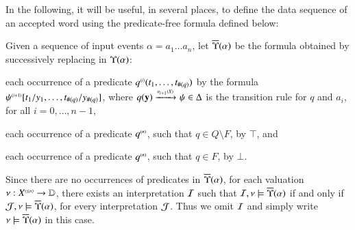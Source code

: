\documentclass{llncs}
\begin{document}
In the following, it will be useful, in several places, to define the
data sequence of an accepted word using the predicate-free formula
defined below:

\begin{definition}\label{def:substform}
Given a sequence of input events $\alpha = a_1 \ldots a_n$, let
$\overline{\Upsilon}({\alpha})$ be the formula obtained by successively replacing
in $\Upsilon({\alpha})$: \begin{compactenum}[(a)]
\item\label{it1:substform} each occurrence of a predicate
  ${q}^{\scriptscriptstyle{({i})}}(t_1,\ldots,t_{\#(q)})$ by the formula
  ${\psi}^{\scriptscriptstyle{({i+1})}}[t_1/y_1,\ldots,t_{\#(q)}/y_{\#(q)}]$, where
  $q(\mathbf y) \xrightarrow{{\scriptscriptstyle a_{i+1}(X)}}_{{\scriptstyle }} \psi \in \Delta$ is the transition
  rule for $q$ and $a_i$, for all $i=0,\ldots,n-1$,
%
\item\label{it2:substform} each occurrence of a predicate
  ${q}^{\scriptscriptstyle{({n})}}$, such that $q \in Q \setminus F$, by $\top$, and
%
\item\label{it3:substform} each occurrence of a predicate
  ${q}^{\scriptscriptstyle{({n})}}$, such that $q \in F$, by $\bot$.
\end{compactenum}
\end{definition}
Since there are no occurrences of predicates in $\overline{\Upsilon}({\alpha})$,
for each valuation $\nu : {X}^{\scriptscriptstyle{({\leq n})}} \rightarrow \mathbb{D}$, there
exists an interpretation $\mathcal{I}$ such that $\mathcal{I},\nu \models
\overline{\Upsilon}({\alpha})$ if and only if $\mathcal{J},\nu \models
\overline{\Upsilon}({\alpha})$, for every interpretation $\mathcal{J}$. Thus we omit $\mathcal{I}$
and simply write $\nu \models \overline{\Upsilon}({\alpha})$ in this case.
\end{document}
